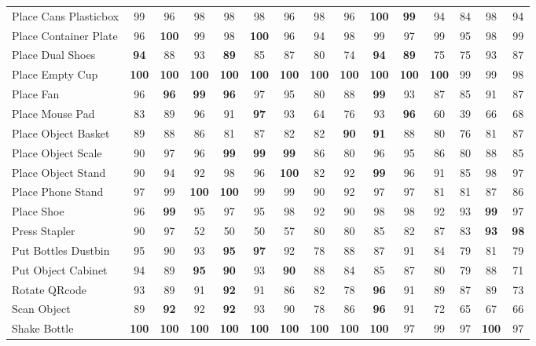 \begin{table}[t]
{\begin{tabular}{lcc|cc|cc|cc|cc|cc|cc}
Place Cans Plasticbox & 99 & 96 & 98 & 98 & 98 & 96 & 98 & 96 & \textbf{100} & \textbf{99} & 94 & 84 & 98 & 94 \\
Place Container Plate & 96 & \textbf{100} & 99 & 98 & \textbf{100} & 96 & 94 & 98 & 99 & 97 & 99 & 95 & 98 & 99 \\
Place Dual Shoes & \textbf{94} & 88 & 93 & \textbf{89} & 85 & 87 & 80 & 74 & \textbf{94} & \textbf{89} & 75 & 75 & 93 & 87 \\
Place Empty Cup & \textbf{100} & \textbf{100} & \textbf{100} & \textbf{100} & \textbf{100} & \textbf{100} & \textbf{100} & \textbf{100} & \textbf{100} & \textbf{100} & \textbf{100} & 99 & 99 & 98 \\
Place Fan & 96 & \textbf{96} & \textbf{99} & \textbf{96} & 97 & 95 & 80 & 88 & \textbf{99} & 93 & 87 & 85 & 91 & 87 \\
Place Mouse Pad & 83 & 89 & 96 & 91 & \textbf{97} & 93 & 64 & 76 & 93 & \textbf{96} & 60 & 39 & 66 & 68 \\
Place Object Basket & 89 & 88 & 86 & 81 & 87 & 82 & 82 & \textbf{90} & \textbf{91} & 88 & 80 & 76 & 81 & 87 \\
Place Object Scale & 90 & 97 & 96 & \textbf{99} & \textbf{99} & \textbf{99} & 86 & 80 & 96 & 95 & 86 & 80 & 88 & 85 \\
Place Object Stand & 90 & 94 & 92 & 98 & 96 & \textbf{100} & 82 & 92 & \textbf{99} & 96 & 91 & 85 & 98 & 97 \\
Place Phone Stand & 97 & 99 & \textbf{100} & \textbf{100} & 99 & 99 & 90 & 92 & 97 & 97 & 81 & 81 & 87 & 86 \\
Place Shoe & 96 & \textbf{99} & 95 & 97 & 95 & 98 & 92 & 90 & 98 & 98 & 92 & 93 & \textbf{99} & 97 \\
Press Stapler & 90 & 97 & 52 & 50 & 50 & 57 & 80 & 80 & 85 & 82 & 87 & 83 & \textbf{93} & \textbf{98} \\
Put Bottles Dustbin & 95 & 90 & 93 & \textbf{95} & \textbf{97} & 92 & 78 & 88 & 87 & 91 & 84 & 79 & 81 & 79 \\
Put Object Cabinet & 94 & 89 & \textbf{95} & \textbf{90} & 93 & \textbf{90} & 88 & 84 & 85 & 87 & 80 & 79 & 88 & 71 \\
Rotate QRcode & 93 & 89 & 91 & \textbf{92} & 91 & 86 & 82 & 78 & \textbf{96} & 91 & 89 & 87 & 89 & 73 \\
Scan Object & 89 & \textbf{92} & 92 & \textbf{92} & 93 & 90 & 78 & 86 & \textbf{96} & 91 & 72 & 65 & 67 & 66 \\
Shake Bottle & \textbf{100} & \textbf{100} & \textbf{100} & \textbf{100} & \textbf{100} & \textbf{100} & \textbf{100} & \textbf{100} & \textbf{100} & 97 & 99 & 97 & \textbf{100} & 97 \\

\end{tabular}}
\end{table}

